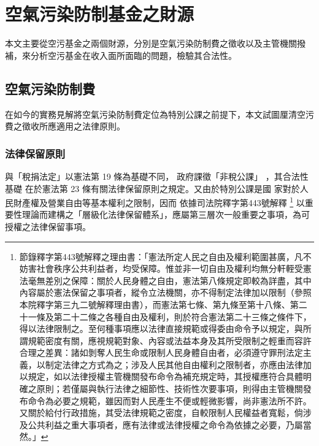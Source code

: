 \documentclass[12pt,a4paper]{article}
\begin{document}

\section{空氣污染防制基金之財源}

本文主要從空污基金之兩個財源，分別是空氣污染防制費之徵收以及主管機關撥補，來分析空污基金在收入面所面臨的問題，檢驗其合法性。

\subsection{空氣污染防制費}

在如今的實務見解將空氣污染防制費定位為特別公課之前提下，本文試圖厘清空污費之徵收所應適用之法律原則。

\subsubsection{法律保留原則}
與「稅捐法定」以憲法第 19 條為基礎不同，
政府課徵「非稅公課」
，其合法性基礎
在於憲法第 23 條有關法律保留原則之規定。又由於特別公課是國
家對於人民財產權及營業自由等基本權利之限制，因而
依據司法院釋字第443號解釋
\footnote{節錄釋字第443號解釋之理由書：「憲法所定人民之自由及權利範圍甚廣，凡不妨害社會秩序公共利益者，均受保障。惟並非一切自由及權利均無分軒輊受憲法毫無差別之保障：關於人民身體之自由，憲法第八條規定即較為詳盡，其中內容屬於憲法保留之事項者，縱令立法機關，亦不得制定法律加以限制（參照本院釋字第三九二號解釋理由書），而憲法第七條、第九條至第十八條、第二十一條及第二十二條之各種自由及權利，則於符合憲法第二十三條之條件下，得以法律限制之。至何種事項應以法律直接規範或得委由命令予以規定，與所謂規範密度有關，應視規範對象、內容或法益本身及其所受限制之輕重而容許合理之差異：諸如剝奪人民生命或限制人民身體自由者，必須遵守罪刑法定主義，以制定法律之方式為之；涉及人民其他自由權利之限制者，亦應由法律加以規定，如以法律授權主管機關發布命令為補充規定時，其授權應符合具體明確之原則；若僅屬與執行法律之細節性、技術性次要事項，則得由主管機關發布命令為必要之規範，雖因而對人民產生不便或輕微影響，尚非憲法所不許。又關於給付行政措施，其受法律規範之密度，自較限制人民權益者寬鬆，倘涉及公共利益之重大事項者，應有法律或法律授權之命令為依據之必要，乃屬當然。」}
以重要性理論而建構之「層級化法律保留體系」，應屬第三層次一般重要之事項，為可授權之法律保留事項。
\end{document}
